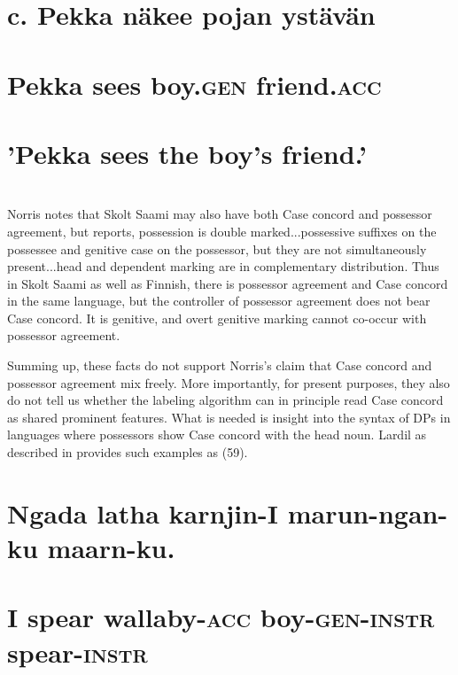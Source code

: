 \documentclass[output=paper
,modfonts
,nonflat]{langsci/langscibook}
\begin{document}
\section{}
\section{  c.  Pekka n\"{a}kee   pojan       yst\"{a}v\"{a}n} 
\section{      Pekka sees     boy.\textsc{gen}     friend.\textsc{acc}} 
\section{      'Pekka sees the boy’s friend.'}
\section{}

Norris notes that Skolt Saami may also have both Case concord and possessor agreement, but \citealt{Miestamo2011} reports, {\textquotedbl}possession is double marked...possessive suffixes on the possessee and genitive case on the possessor, but they are not simultaneously present...head and dependent marking are in complementary distribution.{\textquotedbl} Thus in Skolt Saami as well as Finnish, there is possessor agreement and Case concord in the same language, but the controller of possessor agreement does not bear Case concord. It is genitive, and overt genitive marking cannot co-occur with possessor agreement. 

Summing up, these facts do not support Norris’s claim that Case concord and possessor agreement mix freely. More importantly, for present purposes, they also do not tell us whether the labeling algorithm can in principle {\textquotedbl}read{\textquotedbl} Case concord as shared prominent features. What is needed is insight into the syntax of DPs in languages where possessors show Case concord with the head noun. Lardil as described in \citealt{Richards2007} provides such examples as (59).

\section{Ngada latha   karnjin-I       marun-ngan-ku   maarn-ku.}
\label{bkm:Ref488583290}\section{  I    spear  wallaby-\textsc{acc} boy-\textsc{gen-instr}    spear-\textsc{instr}}
\end{document}
